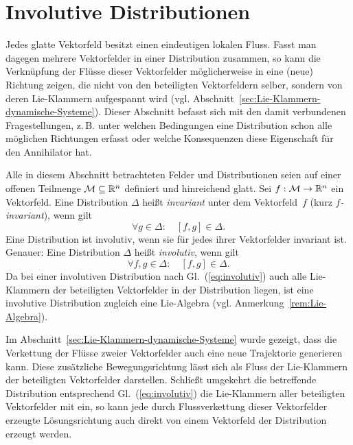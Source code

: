 \section{Involutive Distributionen\label{sec:Involutive-Distributionen}}

Jedes glatte Vektorfeld besitzt einen eindeutigen lokalen Fluss. Fasst
man dagegen mehrere Vektorfelder in einer Distribution zusammen, so
kann die Verknüpfung der Flüsse dieser Vektorfelder möglicherweise
in eine (neue) Richtung zeigen, die nicht von den beteiligten Vektorfeldern
selber, sondern von deren Lie-Klammern aufgespannt wird (vgl. Abschnitt~\ref{sec:Lie-Klammern-dynamische-Systeme}).
Dieser Abschnitt befasst sich mit den damit verbundenen Fragestellungen,
z.\,B. unter welchen Bedingungen eine Distribution schon alle möglichen
Richtungen erfasst oder welche Konsequenzen diese Eigenschaft für
den Annihilator hat.

\medskip{}

Alle in diesem Abschnitt betrachteten Felder und Distributionen seien
auf einer offenen Teilmenge $\mathcal{M}\subseteq{\mathbb{R}}^{n}$ definiert
und hinreichend glatt. Sei $f:\mathcal{M}\to{\mathbb{R}}^{n}$ ein Vektorfeld.
Eine Distribution $\Delta$ heißt \emph{invariant}
unter dem Vektorfeld~$f$ (kurz \emph{$f$-invariant}), wenn gilt
\begin{equation}
\forall g\in\Delta:\quad[f,g]\in\Delta.\label{eq:invariant}
\end{equation}
Eine Distribution ist involutiv, wenn sie für jedes ihrer Vektorfelder
invariant ist. Genauer: Eine Distribution $\Delta$ heißt \emph{involutiv},
wenn gilt 
\begin{equation}
\forall f,g\in\Delta:\quad[f,g]\in\Delta.\label{eq:involutiv}
\end{equation}
Da bei einer involutiven Distribution nach Gl.~(\ref{eq:involutiv})
auch alle Lie-Klammern der beteiligten Vektorfelder in der Distribution
liegen, ist eine involutive Distribution zugleich eine Lie-Algebra
(vgl. Anmerkung~\ref{rem:Lie-Algebra}).

Im Abschnitt~\ref{sec:Lie-Klammern-dynamische-Systeme} wurde gezeigt,
dass die Verkettung der Flüsse zweier Vektor\-felder auch eine neue
Trajektorie generieren kann. Diese zusätzliche Bewegungsrichtung lässt
sich als Fluss der Lie-Klammern der beteiligten Vektor\-felder darstellen.
Schließt umgekehrt die betreffende Distribution entsprechend Gl.~(\ref{eq:involutiv})
die Lie-Klammern aller beteiligten Vektorfelder mit ein, so kann jede
durch Fluss\-verkettung dieser Vektorfelder erzeugte Lösungsrichtung
auch direkt von einem Vektorfeld der Distribution erzeugt werden.

